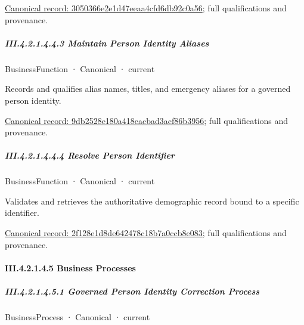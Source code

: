 {\footnotesize \href{../../../../../../../continuum/business/business-function/3050366e2e1d47eeaa4cfd6db92c0a56.md}{Canonical record: 3050366e2e1d47eeaa4cfd6db92c0a56}; full qualifications and provenance.}\par
\subparagraph*{III.4.2.1.4.4.3 Maintain Person Identity Aliases}
\label{navigation:III.4.2.1.4.4.3}

\label{element:9db2528e180a418eacbad3acf86b3956}
{\small BusinessFunction · Canonical · current}\par

Records and qualifies alias names, titles, and emergency aliases for a governed person identity.


{\footnotesize \href{../../../../../../../continuum/business/business-function/9db2528e180a418eacbad3acf86b3956.md}{Canonical record: 9db2528e180a418eacbad3acf86b3956}; full qualifications and provenance.}\par
\subparagraph*{III.4.2.1.4.4.4 Resolve Person Identifier}
\label{navigation:III.4.2.1.4.4.4}

\label{element:2f128e1d8de642478c18b7a0ccb8e083}
{\small BusinessFunction · Canonical · current}\par

Validates and retrieves the authoritative demographic record bound to a specific identifier.


{\footnotesize \href{../../../../../../../continuum/business/business-function/2f128e1d8de642478c18b7a0ccb8e083.md}{Canonical record: 2f128e1d8de642478c18b7a0ccb8e083}; full qualifications and provenance.}\par
\paragraph*{III.4.2.1.4.5 Business Processes}
\label{navigation:III.4.2.1.4.5}

\subparagraph*{III.4.2.1.4.5.1 Governed Person Identity Correction Process}
\label{navigation:III.4.2.1.4.5.1}

\label{element:72f3c63da45d44868579a3bb15d1568c}
{\small BusinessProcess · Canonical · current}\par

